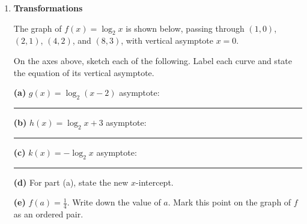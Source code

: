 \documentclass[12pt, twoside]{article}
\begin{document}
\begin{enumerate}[itemsep=0.5cm]
\newpage

\item[3.] \textbf{Transformations}

The graph of $f(x) = \log_2 x$ is shown below, passing through $(1, 0)$,
$(2, 1)$, $(4, 2)$, and $(8, 3)$, with vertical asymptote $x = 0$.

\begin{center}
\end{center}

On the axes above, sketch each of the following. Label each curve and
state the equation of its vertical asymptote.

\textbf{(a)} $g(x) = \log_2(x - 2)$ \hfill asymptote: \rule{4cm}{0.4pt}

\vspace{0.6cm}

\textbf{(b)} $h(x) = \log_2 x + 3$ \hfill asymptote: \rule{4cm}{0.4pt}

\vspace{0.6cm}

\textbf{(c)} $k(x) = -\log_2 x$ \hfill asymptote: \rule{4cm}{0.4pt}

\vspace{0.8cm}

\textbf{(d)} For part (a), state the new $x$-intercept.

\vspace{0.8cm}

\textbf{(e)} $f(a) = \frac{1}{4} $. Write down the value of $a$. Mark this point on the graph of $f$ as an ordered pair.


\end{enumerate}
\end{document}
